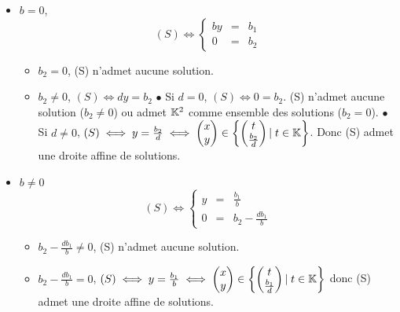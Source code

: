 \documentclass{article}
\begin{document}
\begin{question_kholle}
\begin{itemize}[label=$\bullet$ Supposons]
\begin{itemize}[label=$\bullet$ Si]
				\begin{itemize}[label=$\bullet$ Si]
					\item $b = 0$, 
					\begin{equation*}
						(S) \iff
						\left\{ \begin{array}{ccc}
							by &=& b_1 \\
							0 &=& b_2
						\end{array} \right.
					\end{equation*}
					\begin{itemize}[label=$\bullet$ Si]
						\item $b_2 = 0$, (S) n'admet aucune solution.
						\item $b_2 \neq 0$, $(S) \iff dy = b_2$
							\subitem$\bullet$ Si $d = 0$, $(S) \iff 0 = b_2$. (S) n'admet aucune solution ($b_2 \neq 0$) ou admet $\mathbb K^2$ comme ensemble des solutions ($b_2 = 0$).
							\subitem$\bullet$ Si $d \neq 0$, $(S) \iff y = \frac{b_2}{d} \iff \begin{pmatrix} x \\ y \end{pmatrix} \in \begin{Bmatrix} \begin{pmatrix} t \\ \frac{b_2}{d} \end{pmatrix} |\; t \in \mathbb K \end{Bmatrix}$. Donc (S) admet une droite affine de solutions.
					\end{itemize}
					\item $b \neq 0$
					\begin{equation*}
						(S) \iff
						\left\{ \begin{array}{ccc}
							y &=& \frac{b_1}{b} \\
							0 &=& b_2 - \frac{db_1}{b}
						\end{array} \right.
					\end{equation*}
					\begin{itemize}[label=$\bullet$ Si]
						\item $b_2 - \frac{db_1}{b} \neq 0$, (S) n'admet aucune solution.
						\item $b_2 - \frac{db_1}{b} = 0$, $(S) \iff y = \frac{b_1}{b} \iff \begin{pmatrix} x \\ y \end{pmatrix} \in \begin{Bmatrix} \begin{pmatrix} t \\ \frac{b_1}{d} \end{pmatrix} |\; t \in \mathbb K \end{Bmatrix}$ donc (S) admet une droite affine de solutions.

\end{itemize}
\end{itemize}
\end{itemize}
\end{itemize}
\end{question_kholle}
\end{document}
